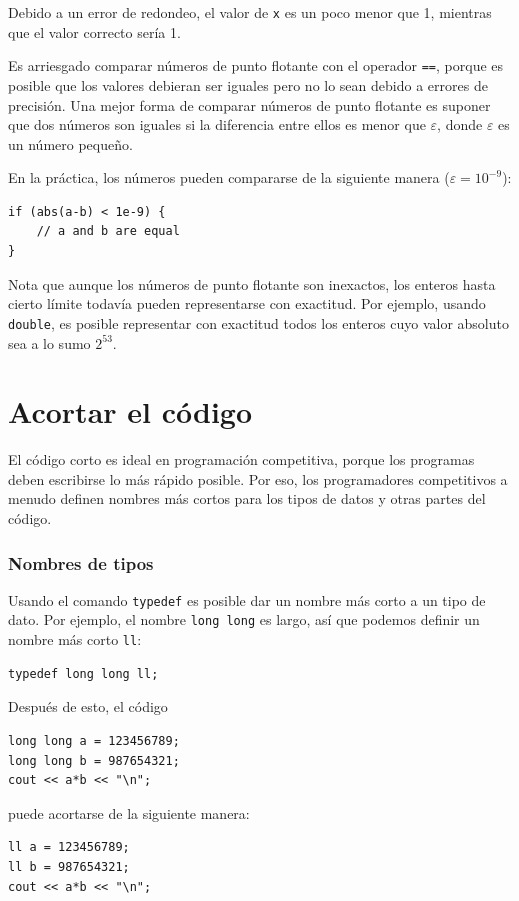 Debido a un error de redondeo,
el valor de \texttt{x} es un poco menor que 1,
mientras que el valor correcto sería 1.

Es arriesgado comparar números de punto flotante
con el operador \texttt{==},
porque es posible que los valores debieran ser
iguales pero no lo sean debido a errores de precisión.
Una mejor forma de comparar números de punto flotante
es suponer que dos números son iguales
si la diferencia entre ellos es menor que $\varepsilon$,
donde $\varepsilon$ es un número pequeño.

En la práctica, los números pueden compararse
de la siguiente manera ($\varepsilon=10^{-9}$):

\begin{lstlisting}
if (abs(a-b) < 1e-9) {
    // a and b are equal
}
\end{lstlisting}

Nota que aunque los números de punto flotante son inexactos,
los enteros hasta cierto límite todavía pueden
representarse con exactitud.
Por ejemplo, usando \texttt{double},
es posible representar con exactitud todos los
enteros cuyo valor absoluto sea a lo sumo $2^{53}$.

\section{Acortar el código}

El código corto es ideal en programación competitiva,
porque los programas deben escribirse
lo más rápido posible.
Por eso, los programadores competitivos a menudo definen
nombres más cortos para los tipos de datos y otras partes del código.

\subsubsection{Nombres de tipos}
Usando el comando \texttt{typedef}
es posible dar un nombre más corto
a un tipo de dato.
Por ejemplo, el nombre \texttt{long long} es largo,
así que podemos definir un nombre más corto \texttt{ll}:
\begin{lstlisting}
typedef long long ll;
\end{lstlisting}
Después de esto, el código
\begin{lstlisting}
long long a = 123456789;
long long b = 987654321;
cout << a*b << "\n";
\end{lstlisting}
puede acortarse de la siguiente manera:
\begin{lstlisting}
ll a = 123456789;
ll b = 987654321;
cout << a*b << "\n";
\end{lstlisting}


